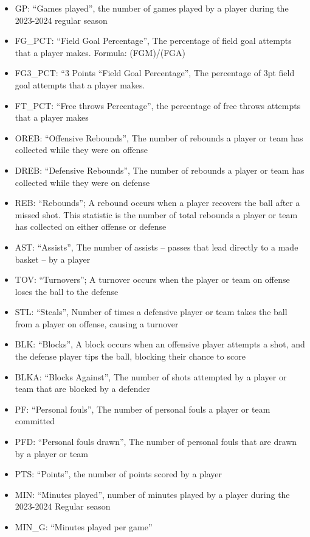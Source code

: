 \documentclass[
]{article}
\providecommand{\tightlist}{%
  \setlength{\itemsep}{0pt}\setlength{\parskip}{0pt}}
\begin{document}
\begin{itemize}
\tightlist
\item
  GP: ``Games played'', the number of games played by a player during
  the 2023-2024 regular season
\item
  FG\_PCT: ``Field Goal Percentage'', The percentage of field goal
  attempts that a player makes. Formula: (FGM)/(FGA)
\item
  FG3\_PCT: ``3 Points ``Field Goal Percentage'', The percentage of 3pt
  field goal attempts that a player makes.
\item
  FT\_PCT: ``Free throws Percentage'', the percentage of free throws
  attempts that a player makes
\item
  OREB: ``Offensive Rebounds'', The number of rebounds a player or team
  has collected while they were on offense
\item
  DREB: ``Defensive Rebounds'', The number of rebounds a player or team
  has collected while they were on defense
\item
  REB: ``Rebounds''; A rebound occurs when a player recovers the ball
  after a missed shot. This statistic is the number of total rebounds a
  player or team has collected on either offense or defense
\item
  AST: ``Assists'', The number of assists -- passes that lead directly
  to a made basket -- by a player
\item
  TOV: ``Turnovers''; A turnover occurs when the player or team on
  offense loses the ball to the defense
\item
  STL: ``Steals'', Number of times a defensive player or team takes the
  ball from a player on offense, causing a turnover
\item
  BLK: ``Blocks'', A block occurs when an offensive player attempts a
  shot, and the defense player tips the ball, blocking their chance to
  score
\item
  BLKA: ``Blocks Against'', The number of shots attempted by a player or
  team that are blocked by a defender
\item
  PF: ``Personal fouls'', The number of personal fouls a player or team
  committed
\item
  PFD: ``Personal fouls drawn'', The number of personal fouls that are
  drawn by a player or team
\item
  PTS: ``Points'', the number of points scored by a player
\item
  MIN: ``Minutes played'', number of minutes played by a player during
  the 2023-2024 Regular season
\item
  MIN\_G: ``Minutes played per game''
\end{itemize}
\end{document}
